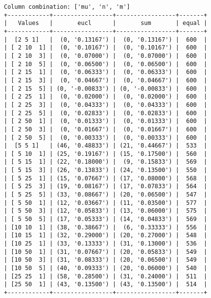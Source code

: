 \documentclass{article}
\begin{document}
\begin{verbatim}
Column combination: ['mu', 'n', 'm']
+------------+-----------------+-----------------+-------+
|   Values   |       eucl      |       sum       | equal |
+------------+-----------------+-----------------+-------+
|  [2 5 1]   |  (0, '0.13167') |  (0, '0.13167') |  600  |
| [ 2 10  1] |  (0, '0.10167') |  (0, '0.10167') |  600  |
| [ 2 10  3] |  (0, '0.07000') |  (0, '0.07000') |  600  |
| [ 2 10  5] |  (0, '0.06500') |  (0, '0.06500') |  600  |
| [ 2 15  1] |  (0, '0.06333') |  (0, '0.06333') |  600  |
| [ 2 15  3] |  (0, '0.04667') |  (0, '0.04667') |  600  |
| [ 2 15  5] | (0, '-0.00833') | (0, '-0.00833') |  600  |
| [ 2 25  1] |  (0, '0.02000') |  (0, '0.02000') |  600  |
| [ 2 25  3] |  (0, '0.04333') |  (0, '0.04333') |  600  |
| [ 2 25  5] |  (0, '0.02833') |  (0, '0.02833') |  600  |
| [ 2 50  1] |  (0, '0.01333') |  (0, '0.01333') |  600  |
| [ 2 50  3] |  (0, '0.01667') |  (0, '0.01667') |  600  |
| [ 2 50  5] |  (0, '0.00333') |  (0, '0.00333') |  600  |
|  [5 5 1]   | (46, '0.48833') | (21, '0.44667') |  533  |
| [ 5 10  1] | (25, '0.19167') | (15, '0.17500') |  560  |
| [ 5 15  1] | (22, '0.18000') |  (9, '0.15833') |  569  |
| [ 5 15  3] | (26, '0.13833') | (24, '0.13500') |  550  |
| [ 5 25  1] | (15, '0.07667') | (17, '0.08000') |  568  |
| [ 5 25  3] | (19, '0.08167') | (17, '0.07833') |  564  |
| [ 5 25  5] | (33, '0.08667') | (20, '0.06500') |  547  |
| [ 5 50  1] | (12, '0.03667') | (11, '0.03500') |  577  |
| [ 5 50  3] | (12, '0.05833') | (13, '0.06000') |  575  |
| [ 5 50  5] | (17, '0.05333') | (14, '0.04833') |  569  |
| [10 10  1] | (38, '0.38667') |  (6, '0.33333') |  556  |
| [10 15  1] | (32, '0.29000') | (20, '0.27000') |  548  |
| [10 25  1] | (33, '0.13333') | (31, '0.13000') |  536  |
| [10 50  1] | (31, '0.07667') | (20, '0.05833') |  549  |
| [10 50  3] | (31, '0.08333') | (20, '0.06500') |  549  |
| [10 50  5] | (40, '0.09333') | (20, '0.06000') |  540  |
| [25 25  1] | (58, '0.28500') | (31, '0.24000') |  511  |
| [25 50  1] | (43, '0.13500') | (43, '0.13500') |  514  |
+------------+-----------------+-----------------+-------+
\end{verbatim}
\end{document}
